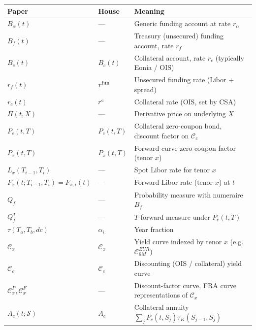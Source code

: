 \documentclass[11pt,a4paper]{article}
\begin{document}
\begin{tabular}{@{}p{3cm}p{3.5cm}p{8.5cm}@{}}
\toprule
Paper                    & House                       & Meaning \\
\midrule
$B_\alpha(t)$            & ---                         & Generic funding account at rate $r_\alpha$ \\
$B_f(t)$                 & ---                         & Treasury (unsecured) funding account, rate $r_f$ \\
$B_c(t)$                 & $B_c(t)$                    & Collateral account, rate $r_c$ (typically Eonia / OIS) \\
$r_f(t)$                 & $r^{\mathrm{fun}}$                     & Unsecured funding rate (Libor + spread) \\
$r_c(t)$                 & $r^{\mathrm{c}}$                     & Collateral rate (OIS, set by CSA) \\
$\Pi(t, X)$              & ---                         & Derivative price on underlying $X$ \\
$P_c(t, T)$              & $P_c(t,T)$                  & Collateral zero-coupon bond, discount factor on $\mathcal{C}_c$ \\
$P_x(t, T)$              & $P_x(t,T)$                  & Forward-curve zero-coupon factor (tenor $x$) \\
$L_x(T_{i-1}, T_i)$      & ---                         & Spot Libor rate for tenor $x$ \\
$F_x(t; T_{i-1}, T_i) = F_{x,i}(t)$ & ---              & Forward Libor rate (tenor $x$) at $t$ \\
$Q_f$                    & ---                         & Probability measure with numeraire $B_f$ \\
$Q_f^T$                  & ---                         & $T$-forward measure under $P_c(t, T)$ \\
$\tau(T_a, T_b, dc)$     & $\alpha_i$                  & Year fraction \\
$\mathcal{C}_x$          & $\mathcal{C}_x$             & Yield curve indexed by tenor $x$ (e.g.\ $\mathcal{C}^{EUR}_{6M}$) \\
$\mathcal{C}_c$          & $\mathcal{C}_c$             & Discounting (OIS / collateral) yield curve \\
$\mathcal{C}^P_x, \mathcal{C}^F_x$ & ---               & Discount-factor curve, FRA curve representations of $\mathcal{C}_x$ \\
$A_c(t; \mathcal{S})$    & $A_c$                       & Collateral annuity $\sum_j P_c(t, S_j)\tau_K(S_{j-1}, S_j)$ \\

\end{tabular}
\end{document}
